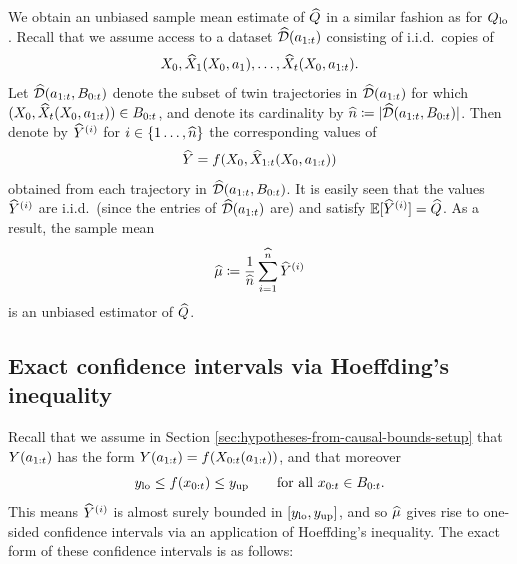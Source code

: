 
We obtain an unbiased sample mean estimate of $\widehat{Q}$ in a similar fashion as for $Q_{\mathrm{lo}}$.
Recall that we assume access to a dataset $\widehat{\mathcal{D}}(a_{1:t})$ consisting of i.i.d.\ copies of
\[
    X_0, \widehat{X}_1(X_0, a_1), \ldots, \widehat{X}_t(X_0, a_{1:t}).
\]
Let $\widehat{\mathcal{D}}(a_{1:t}, B_{0:t})$ denote the subset of twin trajectories in $\widehat{\mathcal{D}}(a_{1:t})$ for which $(X_0, \widehat{X}_{t}(X_0, a_{1:t})) \in B_{0:t}$, and denote its cardinality by $\widehat{n} \coloneqq |\widehat{\mathcal{D}}(a_{1:t}, B_{0:t})|$.
Then denote by $\widehat{Y}^{(i)}$ for $i \in \{1 \ldots, \widehat{n}\}$ the corresponding values of
\[
    \widehat{Y} = f(X_0, \widehat{X}_{1:t}(X_0, a_{1:t}))
\]
obtained from each trajectory in $\widehat{\mathcal{D}}(a_{1:t}, B_{0:t})$.
It is easily seen that the values $\widehat{Y}^{(i)}$ are i.i.d.\ (since the entries of $\widehat{\mathcal{D}}(a_{1:t})$ are) and satisfy $\mathbb{E}[\widehat{Y}^{(i)}] = \widehat{Q}$.
As a result, the sample mean
\[
    \widehat{\mu} \coloneqq \frac{1}{\widehat{n}} \sum_{i=1}^{\widehat{n}} \widehat{Y}^{(i)}
\]
is an unbiased estimator of $\widehat{Q}$.


\subsection{Exact confidence intervals via Hoeffding's inequality}

Recall that we assume in Section \ref{sec:hypotheses-from-causal-bounds-setup} that $Y(a_{1:t})$ has the form $Y(a_{1:t}) = f(X_{0:t}(a_{1:t}))$, and that moreover
\begin{equation} \label{eq:f-boundedness-assumption-hoeffding-proof}
    y_{\mathrm{lo}} \leq f(x_{0:t}) \leq y_{\mathrm{up}} \qquad \text{for all $x_{0:t} \in B_{0:t}$.}
\end{equation}
This means $\widehat{Y}^{(i)}$ is almost surely bounded in $[y_{\mathrm{lo}}, y_{\mathrm{up}}]$, and so $\widehat{\mu}$ gives rise to one-sided confidence intervals via an application of Hoeffding's inequality.
The exact form of these confidence intervals is as follows:


